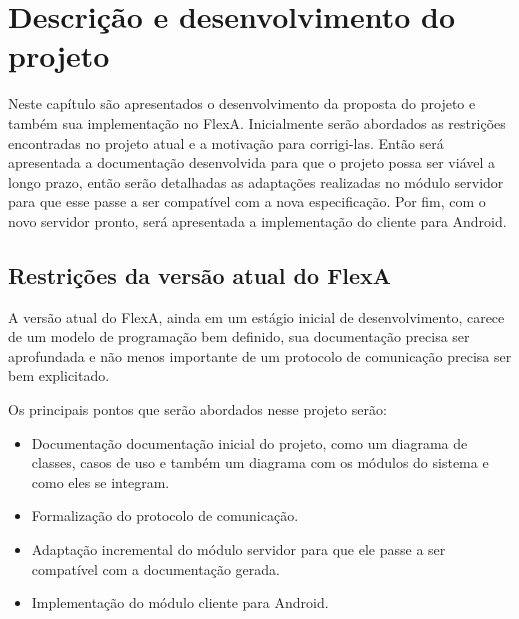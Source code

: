 


\chapter{Descrição e desenvolvimento do projeto}
\label{cap3}

    Neste capítulo são apresentados o desenvolvimento da proposta do projeto e também sua implementação no FlexA. Inicialmente serão abordados as restrições encontradas no projeto atual e a motivação para corrigi-las. Então será apresentada a documentação desenvolvida para que o projeto possa ser viável a longo prazo, então serão detalhadas as adaptações realizadas no módulo servidor para que esse passe a ser compatível com a nova especificação. Por fim, com o novo servidor pronto, será apresentada a implementação do cliente para Android.
    
    
    \section{Restrições da versão atual do FlexA}
    
        A versão atual do FlexA, ainda em um estágio inicial de desenvolvimento, carece de um modelo de programação bem definido, sua documentação precisa ser aprofundada e não menos importante de um protocolo de comunicação precisa ser bem explicitado.
        
        Os principais pontos que serão abordados nesse projeto serão:
        
        \begin{itemize}
            \item Documentação documentação inicial do projeto, como um diagrama de classes, casos de uso e também um diagrama com os módulos do sistema e como eles se integram.
            \item Formalização do protocolo de comunicação.
            \item Adaptação incremental do módulo servidor para que ele passe a ser compatível com a documentação gerada.
            \item Implementação do módulo cliente para Android.
        \end{itemize}
        
